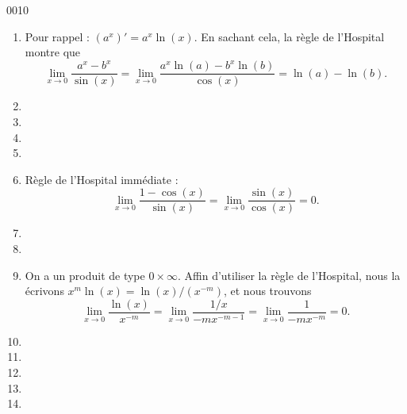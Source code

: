 \begin{corrige}{0010}
\begin{enumerate}
\item
Pour rappel : $(a^x)'=a^x\ln(x)$. En sachant cela, la règle de l'Hospital montre que
\begin{equation}
	\lim_{x\to 0} \frac{ a^x-b^x }{ \sin(x) }=\lim_{x\to 0} \frac{ a^x\ln(a)-b^x\ln(b) }{ \cos(x) }=\ln(a)-\ln(b).
\end{equation}

\item
\item
\item
\item
\item
Règle de l'Hospital immédiate :
\begin{equation}
	\lim_{x\to 0} \frac{ 1-\cos(x) }{ \sin(x) }=\lim_{x\to 0} \frac{ \sin(x) }{ \cos(x) }=0.
\end{equation}

\item
\item
\item

On a un produit de type $0\times\infty$. Affin d'utiliser la règle de l'Hospital, nous la écrivons $x^m\ln(x)=\ln(x)/(x^{-m})$, et nous trouvons
\begin{equation}
	\lim_{x\to 0} \frac{ \ln(x) }{ x^{-m} }=\lim_{x\to 0} \frac{ 1/x }{ -mx^{-m-1} }=\lim_{x\to 0} \frac{1}{ -mx^{-m} }=0.
\end{equation}


\item
\item
\item
\item
\item

\end{enumerate}

\end{corrige}
